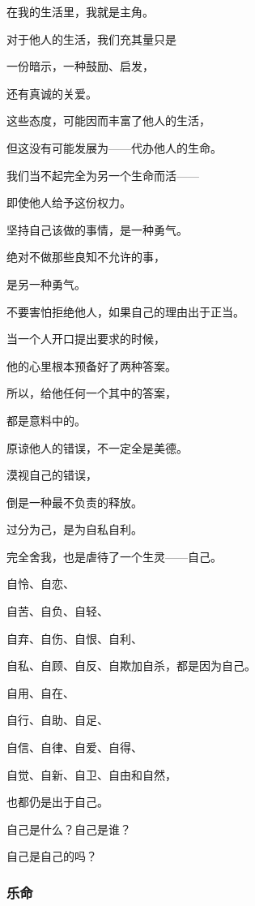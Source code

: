 \par 在我的生活里，我就是主角。
\par 对于他人的生活，我们充其量只是
\par 一份暗示，一种鼓励、启发，
\par 还有真诚的关爱。
\par 这些态度，可能因而丰富了他人的生活，
\par 但这没有可能发展为——代办他人的生命。
\par 我们当不起完全为另一个生命而活——
\par 即使他人给予这份权力。
\par 
\par 坚持自己该做的事情，是一种勇气。
\par 绝对不做那些良知不允许的事，
\par 是另一种勇气。
\par 
\par 不要害怕拒绝他人，如果自己的理由出于正当。
\par 当一个人开口提出要求的时候，
\par 他的心里根本预备好了两种答案。
\par 所以，给他任何一个其中的答案，
\par 都是意料中的。
\par 
\par 原谅他人的错误，不一定全是美德。
\par 漠视自己的错误，
\par 倒是一种最不负责的释放。
\par 
\par 过分为己，是为自私自利。
\par 完全舍我，也是虐待了一个生灵——自己。
\par 自怜、自恋、
\par 自苦、自负、自轻、
\par 自弃、自伤、自恨、自利、
\par 自私、自顾、自反、自欺加自杀，都是因为自己。
\par 自用、自在、
\par 自行、自助、自足、
\par 自信、自律、自爱、自得、
\par 自觉、自新、自卫、自由和自然，
\par 也都仍是出于自己。
\par 
\par 自己是什么？自己是谁？
\par 自己是自己的吗？



\subsubsection{乐命}


